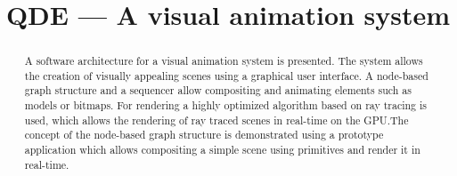 \documentclass[conference]{IEEEtran}
\begin{document}
\title{QDE --- A visual animation system}

\author{
}



\maketitle

\begin{abstract}
\noindent{}%
A software architecture for a visual animation system is presented. The system
allows the creation of visually appealing scenes using a graphical user
interface. A node-based graph structure and a sequencer allow compositing and
animating elements such as models or bitmaps. For rendering a highly optimized
algorithm based on ray tracing is used, which allows the rendering of ray
traced scenes in real-time on the GPU.\@ The concept of the node-based graph
structure is demonstrated using a prototype application which allows
compositing a simple scene using primitives and render it in real-time.
\end{abstract}


\IEEEpeerreviewmaketitle{}
\end{document}

